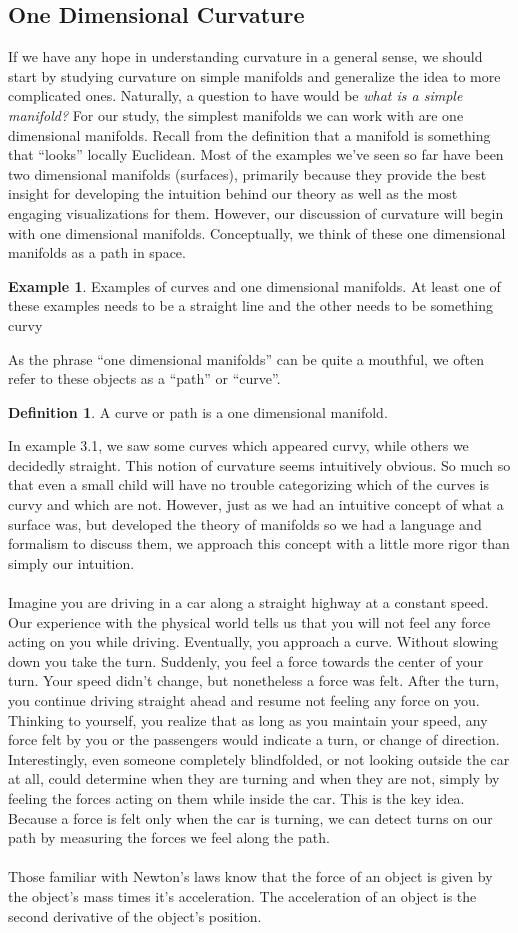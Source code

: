 \documentclass[]{article}
\newcommand\<{\ensuremath{\left\langle}}
\renewcommand\>{\ensuremath{\right\rangle}}
\theoremstyle{definition}
\newtheorem{definition}{Definition}[section]
\theoremstyle{definition}
\newtheorem{example}{Example}[section]
\begin{document}
	\subsection*{One Dimensional Curvature}
	If we have any hope in understanding curvature in a general sense, we should start by studying curvature on simple manifolds and generalize the idea to more complicated ones. Naturally, a question to have would be \textit{what is a simple manifold?} For our study, the simplest manifolds we can work with are one dimensional manifolds. Recall from the definition that a manifold is something that ``looks'' locally Euclidean. Most of the examples we've seen so far have been two dimensional manifolds (surfaces), primarily because they provide the best insight for developing the intuition behind our theory as well as the most engaging visualizations for them. However, our discussion of curvature will begin with one dimensional manifolds. Conceptually, we think of these one dimensional manifolds as a path in space.
	\begin{example}
		Examples of curves and one dimensional manifolds. At least one of these examples needs to be a straight line and the other needs to be something curvy
	\end{example}
	As the phrase ``one dimensional manifolds'' can be quite a mouthful, we often refer to these objects as a ``path'' or ``curve''. 
	\begin{definition}
		A curve or path is a one dimensional manifold.
	\end{definition}
	In example 3.1, we saw some curves which appeared curvy, while others we decidedly straight. This notion of curvature seems intuitively obvious. So much so that even a small child will have no trouble categorizing which of the curves is curvy and which are not. However, just as we had an intuitive concept of what a surface was, but developed the theory of manifolds so we had a language and formalism to discuss them, we approach this concept with a little more rigor than simply our intuition.\\
	\\
	Imagine you are driving in a car along a straight highway at a constant speed. Our experience with the physical world tells us that you will not feel any force acting on you while driving. Eventually, you approach a curve. Without slowing down you take the turn. Suddenly, you feel a force towards the center of your turn. Your speed didn't change, but nonetheless a force was felt. After the turn, you continue driving straight ahead and resume not feeling any force on you. Thinking to yourself, you realize that as long as you maintain your speed, any force felt by you or the passengers would indicate a turn, or change of direction. Interestingly, even someone completely blindfolded, or not looking outside the car at all, could determine when they are turning and when they are not, simply by feeling the forces acting on them while inside the car. This is the key idea. Because a force is felt only when the car is turning, we can detect turns on our path by measuring the forces we feel along the path.\\
	\\
	Those familiar with Newton's laws know that the force of an object is given by the object's mass times it's acceleration. The acceleration of an object is the second derivative of the object's position. 
	
\end{document}
